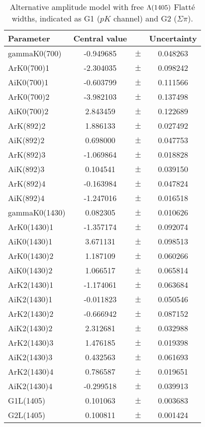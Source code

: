 \clearpage

\begin{table}
\centering
\caption{Alternative amplitude model with free ${\Lambda}(1405)$ Flatt\'e widths, indicated as G1 ($pK$ channel) and G2 ($\Sigma\pi$).}
\begin{tiny}
\begin{tabular}{lccc}
\toprule
Parameter & Central value & & Uncertainty\\
\midrule 
gammaK0(700) & -0.949685 & $\pm$ & 0.048263 \\
ArK0(700)1 & -2.304035 & $\pm$ & 0.098242 \\
AiK0(700)1 & -0.603799 & $\pm$ & 0.111566 \\
ArK0(700)2 & -3.982103 & $\pm$ & 0.137498 \\
AiK0(700)2 & 2.843459 & $\pm$ & 0.122689 \\
ArK(892)2 & 1.886133 & $\pm$ & 0.027492 \\
AiK(892)2 & 0.698000 & $\pm$ & 0.047753 \\
ArK(892)3 & -1.069864 & $\pm$ & 0.018828 \\
AiK(892)3 & 0.104541 & $\pm$ & 0.039150 \\
ArK(892)4 & -0.163984 & $\pm$ & 0.047824 \\
AiK(892)4 & -1.247016 & $\pm$ & 0.016518 \\
gammaK0(1430) & 0.082305 & $\pm$ & 0.010626 \\
ArK0(1430)1 & -1.357174 & $\pm$ & 0.092074 \\
AiK0(1430)1 & 3.671131 & $\pm$ & 0.098513 \\
ArK0(1430)2 & 1.187109 & $\pm$ & 0.060266 \\
AiK0(1430)2 & 1.066517 & $\pm$ & 0.065814 \\
ArK2(1430)1 & -1.174061 & $\pm$ & 0.063684 \\
AiK2(1430)1 & -0.011823 & $\pm$ & 0.050546 \\
ArK2(1430)2 & -0.666942 & $\pm$ & 0.087152 \\
AiK2(1430)2 & 2.312681 & $\pm$ & 0.032988 \\
ArK2(1430)3 & 1.476185 & $\pm$ & 0.019398 \\
AiK2(1430)3 & 0.432563 & $\pm$ & 0.061693 \\
ArK2(1430)4 & 0.786587 & $\pm$ & 0.019651 \\
AiK2(1430)4 & -0.299518 & $\pm$ & 0.039913 \\
G1L(1405) & 0.101063 & $\pm$ & 0.003683 \\
G2L(1405) & 0.100811 & $\pm$ & 0.001424 \\

\end{tabular}
\end{tiny}
\end{table}

